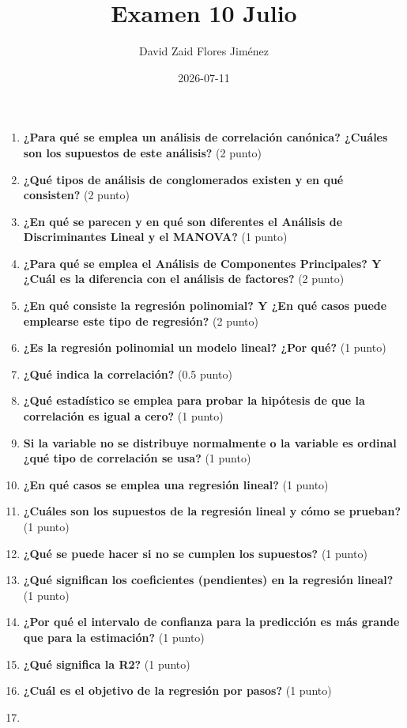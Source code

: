 \documentclass[
]{article}
\title{Examen 10 Julio}
\author{David Zaid Flores Jiménez}
\date{2026-07-11}
\providecommand{\tightlist}{%
  \setlength{\itemsep}{0pt}\setlength{\parskip}{0pt}}
\begin{document}
\maketitle

\begin{enumerate}
\def\labelenumi{\arabic{enumi}.}
\tightlist
\item
  \textbf{¿Para qué se emplea un análisis de correlación canónica?
  ¿Cuáles son los supuestos de este análisis?} (2 punto)
\item
  \textbf{¿Qué tipos de análisis de conglomerados existen y en qué
  consisten?} (2 punto)
\item
  \textbf{¿En qué se parecen y en qué son diferentes el Análisis de
  Discriminantes Lineal y el MANOVA?} (1 punto)
\item
  \textbf{¿Para qué se emplea el Análisis de Componentes Principales? Y
  ¿Cuál es la diferencia con el análisis de factores?} (2 punto)
\item
  \textbf{¿En qué consiste la regresión polinomial? Y ¿En qué casos
  puede emplearse este tipo de regresión?} (2 punto)
\item
  \textbf{¿Es la regresión polinomial un modelo lineal? ¿Por qué?} (1
  punto)
\item
  \textbf{¿Qué indica la correlación?} (0.5 punto)
\item
  \textbf{¿Qué estadístico se emplea para probar la hipótesis de que la
  correlación es igual a cero?} (1 punto)
\item
  \textbf{Si la variable no se distribuye normalmente o la variable es
  ordinal ¿qué tipo de correlación se usa?} (1 punto)
\item
  \textbf{¿En qué casos se emplea una regresión lineal?} (1 punto)
\item
  \textbf{¿Cuáles son los supuestos de la regresión lineal y cómo se
  prueban?} (1 punto)
\item
  \textbf{¿Qué se puede hacer si no se cumplen los supuestos?} (1 punto)
\item
  \textbf{¿Qué significan los coeficientes (pendientes) en la regresión
  lineal?} (1 punto)
\item
  \textbf{¿Por qué el intervalo de confianza para la predicción es más
  grande que para la estimación?} (1 punto)
\item
  \textbf{¿Qué significa la R2?} (1 punto)
\item
  \textbf{¿Cuál es el objetivo de la regresión por pasos?} (1 punto)
\item

\end{enumerate}
\end{document}
